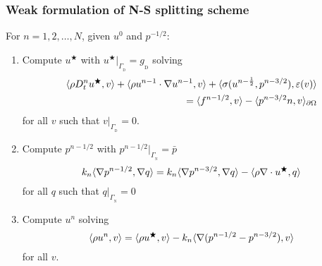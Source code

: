 \begin{frame}
  \frametitle{Weak formulation of N-S splitting scheme}

  \vspace{0.5em}
  For $n = 1, 2, \dots, N$, given $u^{0}$ and $p^{-1/2}$:
  \begin{enumerate}
  \item
    Compute $u^\bigstar$ with $u^{\bigstar}|_{\Gamma_{_\mathrm D}} =
    g_{_\mathrm D}$ solving
    \begin{equation*}
      \begin{split}
        \langle \rho D_t^n u^{\bigstar}, v \rangle
        + \langle \rho u^{n-1} \cdot \nabla u^{n-1}, v \rangle
        + \langle \sigma(u^{n-\frac{1}{2}}, p^{n-3/2}), \varepsilon(v) \rangle \\
        = \langle f^{n-1/2}, v \rangle
        - \langle p^{n-3/2} n, v \rangle_{\partial \Omega}
      \end{split}
    \end{equation*}
    for all $v$ such that $v|_{\Gamma_{_\mathrm D}} = 0$.
  \item
    Compute $p^{n-1/2}$ with $p^{n-1/2}|_{\Gamma_{_\mathrm N}} = \bar{p}$
    \begin{equation*}
      k_n \langle \nabla p^{n-1/2}, \nabla q \rangle
      = k_n \langle \nabla p^{n-3/2}, \nabla q \rangle
      - \langle \rho \nabla \cdot u^{\bigstar}, q \rangle
    \end{equation*}
    for all $q$ such that $q|_{\Gamma_{_\mathrm N}} = 0$
  \item
    Compute $u^{n}$ solving
    \begin{equation*}
      \langle \rho u^n, v \rangle = \langle \rho u^{\bigstar}, v \rangle
      - k_n\langle \nabla(p^{n-1/2} - p^{n-3/2}), v \rangle
    \end{equation*}
    for all $v$.
  \end{enumerate}

\end{frame}

